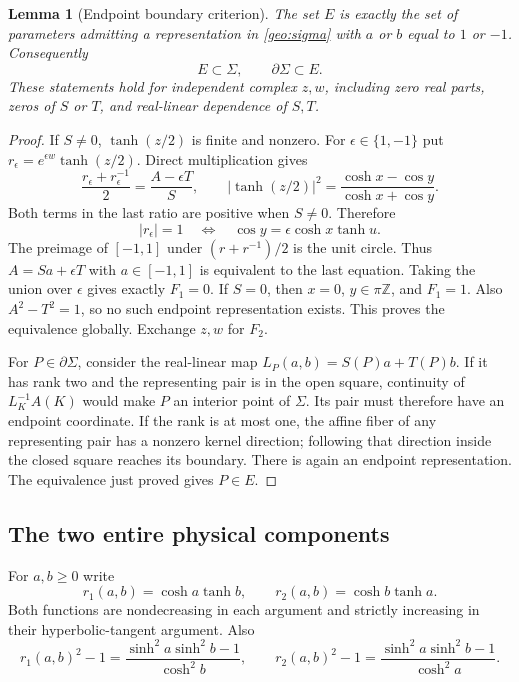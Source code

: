 \documentclass[11pt]{article}
\numberwithin{equation}{section}
\newtheorem{lemma}[theorem]{Lemma}
\theoremstyle{definition}
\begin{document}
\begin{lemma}[Endpoint boundary criterion]\label{geo:endpoint-boundary}
The set $E$ is exactly the set of parameters admitting a representation
in \eqref{geo:sigma} with $a$ or $b$ equal to $1$ or $-1$.
Consequently
\begin{equation}\label{geo:endpoint-sandwich}
 E\subset\Sigma,\qquad \partial\Sigma\subset E.
\end{equation}
These statements hold for independent complex $z,w$, including zero
real parts, zeros of $S$ or $T$, and real-linear dependence of $S,T$.
\end{lemma}
\begin{proof}
If $S\ne0$, $\tanh(z/2)$ is finite and nonzero.  For
$\epsilon\in\{1,-1\}$ put $r_\epsilon=e^{\epsilon w}\tanh(z/2)$.
Direct multiplication gives
\begin{equation}\label{geo:endpoint-identities}
 \frac{r_\epsilon+r_\epsilon^{-1}}2=\frac{A-\epsilon T}{S},
 \qquad
 |\tanh(z/2)|^2=\frac{\cosh x-\cos y}{\cosh x+\cos y}.
\end{equation}
Both terms in the last ratio are positive when $S\ne0$.  Therefore
\[
 |r_\epsilon|=1
 \quad\Longleftrightarrow\quad
 \cos y=\epsilon\cosh x\tanh u.
\]
The preimage of $[-1,1]$ under $(r+r^{-1})/2$ is the unit circle.
Thus $A=Sa+\epsilon T$ with $a\in[-1,1]$ is equivalent to the
last equation.  Taking the union over $\epsilon$ gives exactly $F_1=0$.
If $S=0$, then $x=0$, $y\in\pi\mathbb Z$, and $F_1=1$.
Also $A^2-T^2=1$, so no such endpoint representation exists.
This proves the equivalence globally.  Exchange $z,w$ for $F_2$.

For $P\in\partial\Sigma$, consider the real-linear map
$L_P(a,b)=S(P)a+T(P)b$.  If it has rank two and the representing
pair is in the open square, continuity of $L_K^{-1}A(K)$ would make
$P$ an interior point of $\Sigma$.  Its pair must therefore have an
endpoint coordinate.  If the rank is at most one, the affine fiber
of any representing pair has a nonzero kernel direction; following
that direction inside the closed square reaches its boundary.
There is again an endpoint representation.  The equivalence just
proved gives $P\in E$.
\end{proof}

\subsection{The two entire physical components}
For $a,b\ge0$ write
\[
 r_1(a,b)=\cosh a\tanh b,\qquad r_2(a,b)=\cosh b\tanh a.
\]
Both functions are nondecreasing in each argument and strictly
increasing in their hyperbolic-tangent argument.  Also
\begin{equation}\label{geo:ri-one}
 r_1(a,b)^2-1=\frac{\sinh^2a\sinh^2b-1}{\cosh^2b},\qquad
 r_2(a,b)^2-1=\frac{\sinh^2a\sinh^2b-1}{\cosh^2a}.
\end{equation}
\end{document}

